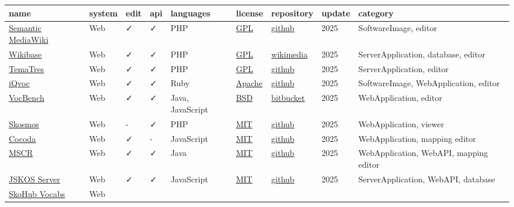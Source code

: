 \documentclass[
  DIV=10]{article}
\begin{document}
\begin{longtable}[]{@{}lllllllll@{}}
\toprule\noalign{}
name & system & edit & api & languages & license & repository & update &
category \\
\midrule\noalign{}
\endhead
\bottomrule\noalign{}
\endlastfoot
\href{https://www.semantic-mediawiki.org/}{Semantic MediaWiki} & Web & ✓
& ✓ & PHP & \href{https://spdx.org/licenses/GPL-3.0-or-later}{GPL} &
\href{https://github.com/SemanticMediaWiki/SemanticMediaWiki/}{github} &
2025 & SoftwareImage, editor \\
\href{http://wikiba.se/}{Wikibase} & Web & ✓ & ✓ & PHP &
\href{https://spdx.org/licenses/GPL-3.0-or-later}{GPL} &
\href{https://gerrit.wikimedia.org/g/mediawiki/extensions/Wikibase}{wikimedia}
& 2025 & ServerApplication, database, editor \\
\href{https://vocabularyserver.com/web/}{TemaTres} & Web & ✓ & ✓ & PHP &
\href{https://spdx.org/licenses/GPL-3.0-or-later}{GPL} &
\href{https://github.com/tematres/TemaTres-Vocabulary-Server}{github} &
2025 & ServerApplication, editor \\
\href{https://iqvoc.net/}{iQvoc} & Web & ✓ & ✓ & Ruby &
\href{https://spdx.org/licenses/Apache-2.0}{Apache} &
\href{https://github.com/innoq/iqvoc}{github} & 2025 & SoftwareImage,
WebApplication, editor \\
\href{https://vocbench.uniroma2.it/}{VocBench} & Web & ✓ & ✓ & Java,
JavaScript & \href{https://spdx.org/licenses/BSD-3-Clause}{BSD} &
\href{https://bitbucket.org/art-uniroma2/vocbench3/src/master/}{bitbucket}
& 2025 & WebApplication, editor \\
\href{https://skosmos.org/}{Skosmos} & Web & - & ✓ & PHP &
\href{https://spdx.org/licenses/MIT}{MIT} &
\href{https://github.com/NatLibFi/Skosmos}{github} & 2025 &
WebApplication, viewer \\
\href{https://coli-conc.gbv.de/cocoda/}{Cocoda} & Web & ✓ & - &
JavaScript & \href{https://spdx.org/licenses/MIT}{MIT} &
\href{https://github.com/gbv/cocoda}{github} & 2025 & WebApplication,
mapping editor \\
\href{https://cscfi.github.io/mscr-docs/}{MSCR} & Web & ✓ & ✓ & Java &
\href{https://spdx.org/licenses/MIT}{MIT} &
\href{https://github.com/CSCfi/mscr-compose}{github} & 2025 &
WebApplication, WebAPI, mapping editor \\
\href{https://github.com/gbv/jskos-server}{JSKOS Server} & Web & ✓ & ✓ &
JavaScript & \href{https://spdx.org/licenses/MIT}{MIT} &
\href{https://github.com/gbv/jskos-server}{github} & 2025 &
ServerApplication, WebAPI, database \\
\href{https://github.com/skohub-io/skohub-vocabs}{SkoHub Vocabs} & Web &

\end{longtable}
\end{document}
